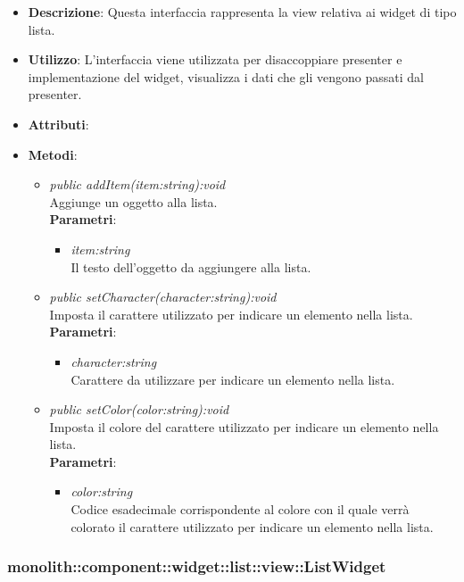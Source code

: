 \begin{itemize}
\item \textbf{Descrizione}: Questa interfaccia rappresenta la view relativa ai widget di tipo lista.
\item \textbf{Utilizzo}: L'interfaccia viene utilizzata per disaccoppiare presenter e implementazione del widget, visualizza i dati che gli vengono passati dal presenter.
\item \textbf{Attributi}:
\item \textbf{Metodi}:
	\begin{itemize}
	\item \textit{public addItem(item:string):void}\\
	Aggiunge un oggetto alla lista.
		\\ \textbf{Parametri}: \begin{itemize}
		\item \textit{item:string}\\
		Il testo dell'oggetto da aggiungere alla lista.
		\end{itemize} 
	\item \textit{public setCharacter(character:string):void}\\
		Imposta il carattere utilizzato per indicare un elemento nella lista.
		\\ \textbf{Parametri}: \begin{itemize}
		\item \textit{character:string}\\
		Carattere da utilizzare per indicare un elemento nella lista.
		\end{itemize} 
	\item \textit{public setColor(color:string):void}\\
		Imposta il colore del carattere utilizzato per indicare un elemento nella lista.
		\\ \textbf{Parametri}: \begin{itemize}
		\item \textit{color:string}\\
		Codice esadecimale corrispondente al colore con il quale verrà colorato il carattere utilizzato per indicare un elemento nella lista.
		\end{itemize} 
	\end{itemize}
\end{itemize}

\subsubsection{monolith::component::widget::list::view::ListWidget}

